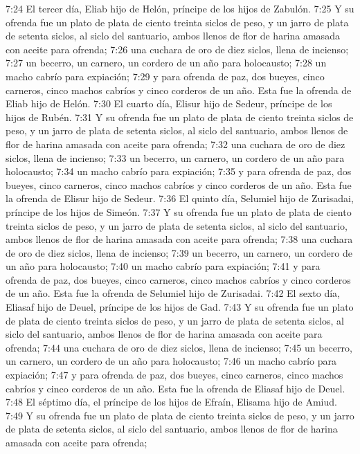 7:24 El tercer día, Eliab hijo de Helón, príncipe de los hijos de Zabulón.  
7:25 Y su ofrenda fue un plato de plata de ciento treinta siclos de peso,  y un jarro de plata de setenta siclos, al siclo del santuario, ambos llenos de flor de harina amasada con aceite para ofrenda;  
7:26 una cuchara de oro de diez siclos,  llena de incienso;  
7:27 un becerro, un carnero, un cordero de un año para holocausto;  
7:28 un macho cabrío para expiación; 
7:29 y para ofrenda de paz, dos bueyes, cinco carneros, cinco machos cabríos y cinco corderos de un año. Esta fue la ofrenda de Eliab hijo de Helón.  
7:30 El cuarto día, Elisur hijo de Sedeur, príncipe de los hijos de Rubén.  
7:31 Y su ofrenda fue un plato de plata de ciento treinta siclos de peso,  y un jarro de plata de setenta siclos, al siclo del santuario, ambos llenos de flor de harina amasada con aceite para ofrenda;  
7:32 una cuchara de oro de diez siclos,  llena de incienso;  
7:33 un becerro, un carnero, un cordero de un año para holocausto;  
7:34 un macho cabrío para expiación;  
7:35 y para ofrenda de paz, dos bueyes, cinco carneros, cinco machos cabríos y cinco corderos de un año. Esta fue la ofrenda de Elisur hijo de Sedeur.  
7:36 El quinto día, Selumiel hijo de Zurisadai, príncipe de los hijos de Simeón.  
7:37 Y su ofrenda fue un plato de plata de ciento treinta siclos de peso,  y un jarro de plata de setenta siclos, al siclo del santuario, ambos llenos de flor de harina amasada con aceite para ofrenda;  
7:38 una cuchara de oro de diez siclos,  llena de incienso;  
7:39 un becerro, un carnero, un cordero de un año para holocausto;  
7:40 un macho cabrío para expiación;  
7:41 y para ofrenda de paz, dos bueyes, cinco carneros, cinco machos cabríos y cinco corderos de un año. Esta fue la ofrenda de Selumiel hijo de Zurisadai.  
7:42 El sexto día, Eliasaf hijo de Deuel, príncipe de los hijos de Gad.  
7:43 Y su ofrenda fue un plato de plata de ciento treinta siclos de peso,  y un jarro de plata de setenta siclos, al siclo del santuario, ambos llenos de flor de harina amasada con aceite para ofrenda;  
7:44 una cuchara de oro de diez siclos,  llena de incienso;  
7:45 un becerro, un carnero, un cordero de un año para holocausto;  
7:46 un macho cabrío para expiación;  
7:47 y para ofrenda de paz, dos bueyes, cinco carneros, cinco machos cabríos y cinco corderos de un año. Esta fue la ofrenda de Eliasaf hijo de Deuel.  
7:48 El séptimo día, el príncipe de los hijos de Efraín, Elisama hijo de Amiud.  
7:49 Y su ofrenda fue un plato de plata de ciento treinta siclos de peso,  y un jarro de plata de setenta siclos, al siclo del santuario, ambos llenos de flor de harina amasada con aceite para ofrenda;  
